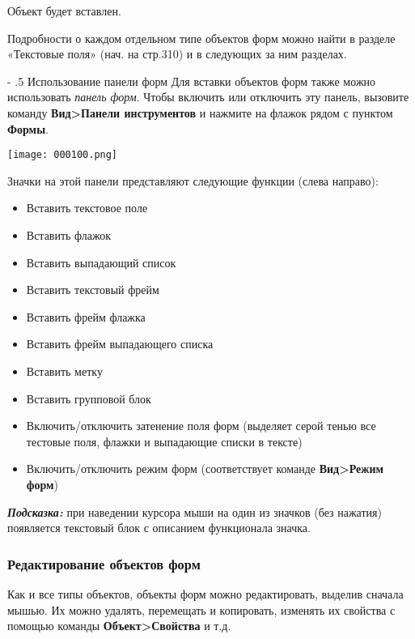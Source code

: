 ﻿\documentclass[a4paper,10pt]{article}
\makeatletter
\renewcommand\paragraph{%
   \@startsection{paragraph}{4}{0mm}%
      {-\baselineskip}%
      {.5\baselineskip}%
      {\normalfont\normalsize\bfseries}}
\makeatother
\begin{document}
Объект будет вставлен.

Подробности о каждом отдельном типе объектов форм можно найти в разделе «Текстовые поля» (нач. на стр.310) и в следующих за ним разделах.

\paragraph{Использование панели форм}
Для вставки объектов форм также можно использовать \textit{панель форм}. Чтобы включить или отключить эту панель, вызовите команду \textbf{Вид>Панели инструментов} и нажмите на флажок рядом с пунктом \textbf{Формы}.

\texttt{[image: 000100.png]}

Значки на этой панели представляют следующие функции (слева направо):

\begin{itemize}
 \item Вставить текстовое поле
 \item Вставить флажок
 \item Вставить выпадающий список
 \newline
 \item Вставить текстовый фрейм
 \item Вставить фрейм флажка
 \item Вставить фрейм выпадающего списка
 \item Вставить метку
 \item Вставить групповой блок
 \newline
 \item Включить/отключить затенение поля форм (выделяет серой тенью все тестовые поля, флажки и выпадающие списки в тексте)
 \item Включить/отключить режим форм (соответствует команде \textbf{Вид>Режим форм})
\end{itemize}

\begin{mdframed}[backgroundcolor=blue!10]
\textbf{\textit{Подсказка:}} при наведении курсора мыши на один из значков (без нажатия) появляется текстовый блок с описанием функционала значка.
\end{mdframed}

\subsubsection{Редактирование объектов форм}
Как и все типы объектов, объекты форм можно редактировать, выделив сначала мышью. Их можно удалять, перемещать и копировать, изменять их свойства с помощью команды \textbf{Объект>Свойства} и т.д.
\end{document}
